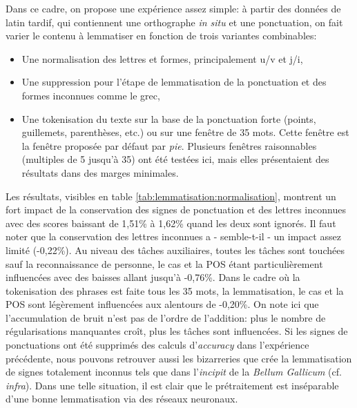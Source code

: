 Dans ce cadre, on propose une expérience assez simple: à partir des données de latin tardif, qui contiennent une orthographe \textit{in situ} et une ponctuation, on fait varier le contenu à lemmatiser en fonction de trois variantes combinables:
\begin{itemize}
    \item Une normalisation des lettres et formes, principalement u/v et j/i,
    \item Une suppression pour l'étape de lemmatisation de la ponctuation et des formes inconnues comme le grec,
    \item Une tokenisation du texte sur la base de la ponctuation forte (points, guillemets, parenthèses, etc.) ou sur une fenêtre de 35 mots. Cette fenêtre est la fenêtre proposée par défaut par \textit{pie}. Plusieurs fenêtres raisonnables (multiples de 5 jusqu'à 35) ont été testées ici, mais elles présentaient des résultats dans des marges minimales.
\end{itemize}
Les résultats, visibles en table \ref{tab:lemmatisation:normalisation}, montrent un fort impact de la conservation des signes de ponctuation et des lettres inconnues avec des scores baissant de 1,51\% à 1,62\% quand les deux sont ignorés. Il faut noter que la conservation des lettres inconnues a - semble-t-il - un impact assez limité (-0,22\%). Au niveau des tâches auxiliaires, toutes les tâches sont touchées sauf la reconnaissance de personne, le cas et la POS étant particulièrement influencées avec des baisses allant jusqu'à -0,76\%. Dans le cadre où la tokenisation des phrases est faite tous les 35 mots, la lemmatisation, le cas et la POS sont légèrement influencées aux alentours de -0,20\%. On note ici que l'accumulation de bruit n'est pas de l'ordre de l'addition: plus le nombre de régularisations manquantes croît, plus les tâches sont influencées. Si les signes de ponctuations ont été supprimés des calculs d'\textit{accuracy} dans l'expérience précédente, nous pouvons retrouver aussi les bizarreries que crée la lemmatisation de signes totalement inconnus tels que dans l'\textit{incipit} de la \textit{Bellum Gallicum} (cf. \textit{infra}). Dans une telle situation, il est clair que le prétraitement est inséparable d'une bonne lemmatisation via des réseaux neuronaux.

